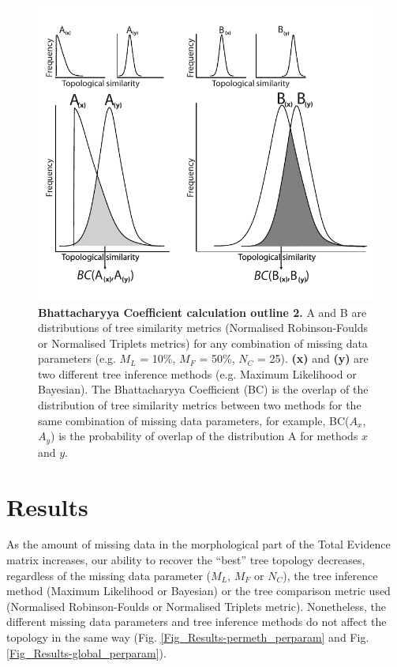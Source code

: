 \begin{figure}[!ht]
\centering
    \includegraphics[width=1\textwidth]{TEM/Figures/Fig3.pdf}
\caption[Bhattacharyya Coefficient calculation outline 2]{\textbf{Bhattacharyya Coefficient calculation outline 2.} A and B are distributions of tree similarity metrics (Normalised Robinson-Foulds or Normalised Triplets metrics) for any combination of missing data parameters (e.g. $M_{L}$ = 10\%, $M_{F}$ = 50\%, $N_{C}$ = 25). \textbf{(x)} and \textbf{(y)} are two different tree inference methods (e.g. Maximum Likelihood or Bayesian). The Bhattacharyya Coefficient (BC) is the overlap of the distribution of tree similarity metrics between two methods for the same combination of missing data parameters, for example, BC($A_{x}$,$A_{y}$) is the probability of overlap of the distribution A for methods $x$ and $y$.}
\label{Fig_Bhattacharyya_Coefficients2} 
\end{figure}

%
%

\section{Results}
As the amount of missing data in the morphological part of the Total Evidence matrix increases, our ability to recover the ``best'' tree topology decreases, regardless of the missing data parameter ($M_{L}$, $M_{F}$ or $N_{C}$), the tree inference method (Maximum Likelihood or Bayesian) or the tree comparison metric used (Normalised Robinson-Foulds or Normalised Triplets metric).
Nonetheless, the different missing data parameters and tree inference methods do not affect the topology in the same way (Fig. \ref{Fig_Results-permeth_perparam} and Fig. \ref{Fig_Results-global_perparam}).

